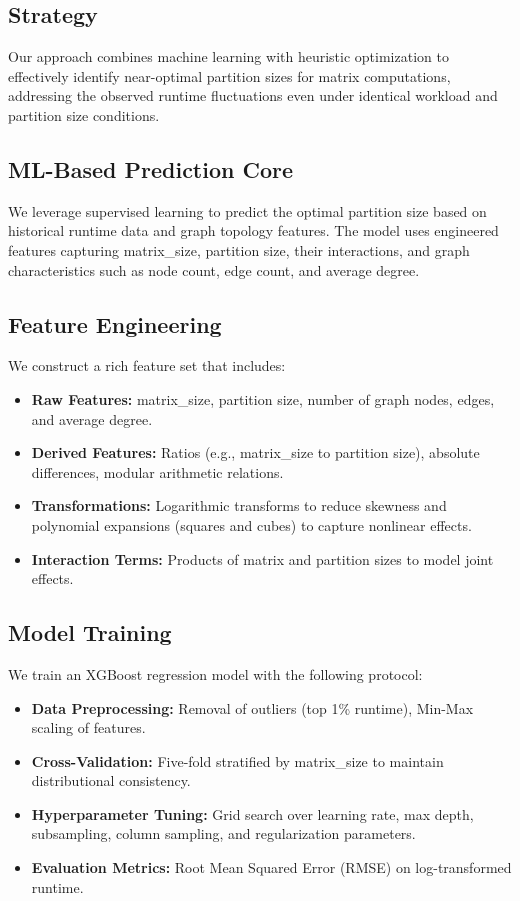 \documentclass[9pt,conference]{IEEEtran}
\begin{document}
\subsection{Strategy}

Our approach combines machine learning with heuristic optimization to effectively identify near-optimal partition sizes for matrix computations, addressing the observed runtime fluctuations even under identical workload and partition size conditions.

\subsection{ML-Based Prediction Core}
We leverage supervised learning to predict the optimal partition size based on historical runtime data and graph topology features. The model uses engineered features capturing matrix\_size, partition size, their interactions, and graph characteristics such as node count, edge count, and average degree.

\subsection{Feature Engineering}
We construct a rich feature set that includes:
\begin{itemize}
    \item \textbf{Raw Features:} matrix\_size, partition size, number of graph nodes, edges, and average degree.
    \item \textbf{Derived Features:} Ratios (e.g., matrix\_size to partition size), absolute differences, modular arithmetic relations.
    \item \textbf{Transformations:} Logarithmic transforms to reduce skewness and polynomial expansions (squares and cubes) to capture nonlinear effects.
    \item \textbf{Interaction Terms:} Products of matrix and partition sizes to model joint effects.
\end{itemize}

\subsection{Model Training}
We train an XGBoost regression model with the following protocol:
\begin{itemize}
    \item \textbf{Data Preprocessing:} Removal of outliers (top 1\% runtime), Min-Max scaling of features.
    \item \textbf{Cross-Validation:} Five-fold stratified by matrix\_size to maintain distributional consistency.
    \item \textbf{Hyperparameter Tuning:} Grid search over learning rate, max depth, subsampling, column sampling, and regularization parameters.
    \item \textbf{Evaluation Metrics:} Root Mean Squared Error (RMSE) on log-transformed runtime.
\end{itemize}
\end{document}
